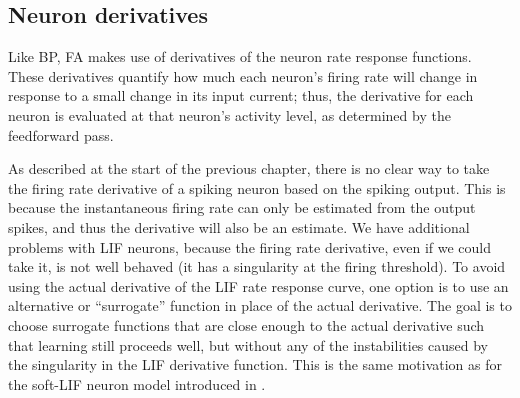 \subsection{Neuron derivatives}

Like BP, FA makes use of
derivatives of the neuron rate response functions.
These derivatives quantify how much each neuron's firing rate will change
in response to a small change in its input current;
thus, the derivative for each neuron is evaluated at that neuron's activity level,
as determined by the feedforward pass.

As described at the start of the previous chapter,
there is no clear way to take the firing rate derivative of a spiking neuron
based on the spiking output.
This is because the instantaneous firing rate can only be estimated
from the output spikes,
and thus the derivative will also be an estimate.
We have additional problems with LIF neurons,
because the firing rate derivative, even if we could take it,
is not well behaved (it has a singularity at the firing threshold).
To avoid using the actual derivative of the LIF rate response curve,
one option \parencite{Neftci2017,Samadi2017}
is to use an alternative or ``surrogate'' function
in place of the actual derivative.
The goal is to choose surrogate functions that are close enough
to the actual derivative such that learning still proceeds well,
but without any of the instabilities caused by the singularity
in the LIF derivative function.
This is the same motivation as for the soft-LIF neuron model
introduced in .

